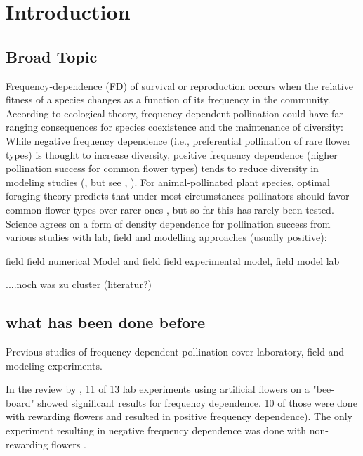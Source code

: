 \section{Introduction}


\subsection*{Broad Topic}

Frequency-dependence (FD) of survival or reproduction occurs when the relative fitness of a species changes as a function of its frequency in the community. According to ecological theory, frequency dependent pollination could have far-ranging consequences for species coexistence and the maintenance of diversity: While negative frequency dependence (i.e., preferential pollination of rare flower types) is thought to increase diversity, positive frequency dependence (higher pollination success for common flower types) tends to reduce diversity in modeling studies (\citealt{may1974stability}, but see \citealt{bever1999dynamics}, \citealt{molofsky2002novel}).
For animal-pollinated plant species, optimal foraging theory predicts that under most circumstances pollinators should favor common flower types over rarer ones \citep{kunin1996pollinator}, but so far this has rarely been tested. \\


Science agrees on a form of density dependence for pollination success from various studies with lab, field and modelling approaches (usually positive):

\citep{bernhardt2008effects} field
\citep{elliott2009effects} field
\citep{essenberg2012explaining} numerical Model and field
\citep{Kunin1997} field
\citep{kunin1993sex} experimental
\citep{morris2010benefit} model, field
\citep{rands2010effects} model
\citep{stout1998influence} lab

....noch was zu cluster (literatur?)

\subsection*{what has been done before}

Previous studies of frequency-dependent pollination cover laboratory, field and modeling experiments.

In the review by \cite{smithson2001pollinator}, 11 of 13 lab experiments using artificial flowers on a "bee-board" showed significant results for frequency dependence. 10 of those were done with rewarding flowers and resulted in positive frequency dependence\citep{smithson1996frequency,smithson1997density}). The only experiment resulting in negative frequency dependence was done with non-rewarding flowers \citep{smithson1997negative}. 

